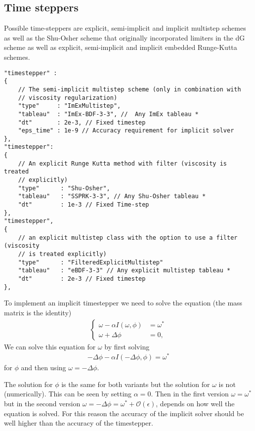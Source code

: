 \subsection{Time steppers}
Possible time-steppers are explicit, semi-implicit and implicit multistep schemes
as well as the Shu-Osher scheme that originally incorporated limiters in the dG scheme
as well as explicit, semi-implicit and implicit embedded Runge-Kutta schemes.
\begin{verbatim}
"timestepper" :
{
    // The semi-implicit multistep scheme (only in combination with
    // viscosity regularization)
    "type"     : "ImExMultistep",
    "tableau"  : "ImEx-BDF-3-3", //  Any ImEx tableau *
    "dt"       : 2e-3, // Fixed timestep
    "eps_time" : 1e-9 // Accuracy requirement for implicit solver
},
"timestepper":
{
    // An explicit Runge Kutta method with filter (viscosity is treated
    // explicitly)
    "type"      : "Shu-Osher",
    "tableau"   : "SSPRK-3-3", // Any Shu-Osher tableau *
    "dt"        : 1e-3 // Fixed Time-step
},
"timestepper",
{
    // an explicit multistep class with the option to use a filter (viscosity
    // is treated explicitly)
    "type"      : "FilteredExplicitMultistep"
    "tableau"   : "eBDF-3-3" // Any explicit multistep tableau *
    "dt"        : 2e-3 // Fixed timestep
},
\end{verbatim}
To implement an implicit timestepper we need to solve the equation (the mass matrix is the identity)
\begin{align}\label{eq:split}
    \begin{cases}
        \omega - \alpha I(\omega, \phi) &= \omega^*  \\
        \omega+\Delta\phi &= 0,
    \end{cases}
\end{align}
We can solve this equation for $\omega$ by first solving
\begin{align} \label{eq:single}
    -\Delta\phi - \alpha I(-\Delta\phi, \phi) = \omega^*
\end{align}
for $\phi$ and then using $\omega = -\Delta\phi$.

The solution for $\phi$ is the same for both variants but the solution for
$\omega$ is not (numerically). This can be seen by setting $\alpha=0$. Then in
the first version $\omega=\omega^*$ but in the second version
$\omega=-\Delta\phi = \omega^* + \mathcal O(\epsilon)$, depends on how well the
equation is solved. For this reason the accuracy of the implicit solver should
be well higher than the accuracy of the timestepper.

